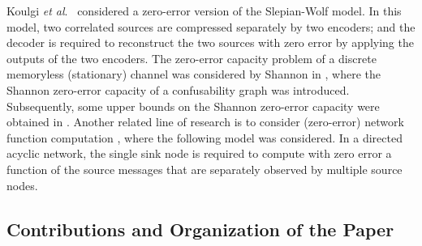 \documentclass[11pt,draftclsnofoot,onecolumn]{IEEEtran}
\begin{document}
Koulgi \textit{et al}.~\cite{Koulgi_zero-error-cod_cor_inf_sour} considered a zero-error version of the Slepian-Wolf model. In this model, two correlated sources are compressed separately by two encoders; and the decoder is required to reconstruct the two sources with zero error by applying the outputs of the two encoders.
The zero-error capacity problem of a discrete memoryless (stationary) channel was considered by Shannon in \cite{Shannon_zero_cap_noisy_channel}, where the Shannon zero-error capacity of a confusability graph was introduced. Subsequently, some upper bounds on the Shannon zero-error capacity were obtained in \cite{Shannon_zero_cap_noisy_channel, Rosenfeld_frac_color_num_bound_shannon_cap, Lovasz_shannon_cap_graph,Haemers_shannon_lovasz_problems}.
Another related line of research is to consider (zero-error) network function computation \cite{Appuswamy11,Appuswamy13,Ramamoorthy-Langberg-JSAC13-sum-networks,
Rai-Dey-TIT-2012,Tripathy-Ramamoorthy-IT18-sum-networks,
Huang_Comment_cut_set_bound,Guang_Improved_upper_bound,
Wang-Tightness_upper_bound}, where the following model was considered. In a directed acyclic
network, the single sink node is required to compute with zero error a function of the source messages that are separately observed by multiple source nodes.



\subsection{Contributions and Organization of the Paper}


\end{document}
